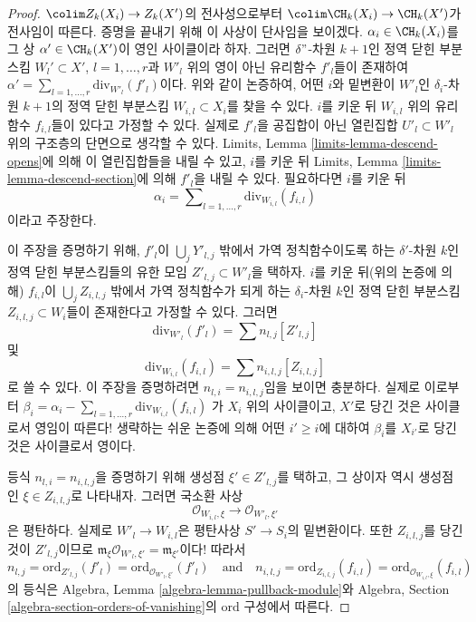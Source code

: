 \begin{proof}
\medskip\noindent
$\colim Z_k(X_i) \to Z_k(X')$의 전사성으로부터
$\colim \CH_k(X_i) \to \CH_k(X')$가 전사임이 따른다.
증명을 끝내기 위해 이 사상이 단사임을 보이겠다.
$\alpha_i \in \CH_k(X_i)$를 그 상
$\alpha' \in \CH_k(X')$이 영인 사이클이라 하자. 그러면
$\delta"$-차원 $k + 1$인 정역 닫힌 부분스킴
$W_l' \subset X'$, $l = 1, \ldots, r$과 $W'_l$ 위의 영이 아닌
유리함수 $f'_l$들이 존재하여
$\alpha' = \sum_{l = 1, \ldots, r} \text{div}_{W'_l}(f'_l)$이다.
위와 같이 논증하여, 어떤 $i$와 밑변환이 $W'_l$인
$\delta_i$-차원 $k + 1$의 정역 닫힌 부분스킴
$W_{i, l} \subset X_i$를 찾을 수 있다. $i$를 키운 뒤
$W_{i, l}$ 위의 유리함수 $f_{i, l}$들이 있다고 가정할 수 있다.
실제로 $f'_l$을 공집합이 아닌 열린집합
$U'_l \subset W'_l$ 위의 구조층의 단면으로 생각할 수 있다.
Limits, Lemma \ref{limits-lemma-descend-opens}에 의해 이 열린집합들을
내릴 수 있고, $i$를 키운 뒤 Limits, Lemma
\ref{limits-lemma-descend-section}에 의해 $f'_l$을 내릴 수 있다.
필요하다면 $i$를 키운 뒤
$$
\alpha_i = \sum\nolimits_{l = 1, \ldots, r} \text{div}_{W_{i, l}}(f_{i, l})
$$
이라고 주장한다.

\medskip\noindent
이 주장을 증명하기 위해, $f'_l$이
$\bigcup_j Y'_{l, j}$ 밖에서 가역 정칙함수이도록 하는
$\delta'$-차원 $k$인 정역 닫힌 부분스킴들의 유한 모임
$Z'_{l, j} \subset W'_l$을 택하자. $i$를 키운 뒤(위의 논증에 의해)
$f_{i, l}$이 $\bigcup_j Z_{i, l, j}$ 밖에서 가역 정칙함수가 되게
하는 $\delta_i$-차원 $k$인 정역 닫힌 부분스킴
$Z_{i, l, j} \subset W_i$들이 존재한다고 가정할 수 있다. 그러면
$$
\text{div}_{W'_l}(f'_l) = \sum n_{l, j} [Z'_{l, j}]
$$
및
$$
\text{div}_{W_{i, l}}(f_{i, l}) = \sum n_{i, l, j} [Z_{i, l, j}]
$$
로 쓸 수 있다. 이 주장을 증명하려면
$n_{l, i} = n_{i, l, j}$임을 보이면 충분하다. 실제로 이로부터
$\beta_i =
\alpha_i - \sum\nolimits_{l = 1, \ldots, r} \text{div}_{W_{i, l}}(f_{i, l})$
가 $X_i$ 위의 사이클이고, $X'$로 당긴 것은 사이클로서 영임이
따른다! 생략하는 쉬운 논증에 의해 어떤 $i' \geq i$에 대하여
$\beta_i$를 $X_{i'}$로 당긴 것은 사이클로서 영이다.

\medskip\noindent
등식 $n_{l, i} = n_{i, l, j}$을 증명하기 위해 생성점
$\xi' \in Z'_{l, j}$를 택하고, 그 상이자 역시 생성점인
$\xi \in Z_{i, l, j}$로 나타내자. 그러면 국소환 사상
$$
\mathcal{O}_{W_{i, l}, \xi}
\longrightarrow
\mathcal{O}_{W'_l, \xi'}
$$
은 평탄하다. 실제로 $W'_l \to W_{i, l}$은 평탄사상
$S' \to S_i$의 밑변환이다. 또한 $Z_{i, l, j}$를 당긴 것이
$Z'_{l, j}$이므로
$\mathfrak m_\xi \mathcal{O}_{W'_l, \xi'} = \mathfrak m_{\xi'}$이다!
따라서
$$
n_{l, j} = \text{ord}_{Z'_{l, j}}(f'_l) =
\text{ord}_{\mathcal{O}_{W'_l, \xi'}}(f'_l)
\quad\text{and}\quad
n_{i, l, j} = \text{ord}_{Z_{i, l, j}}(f_{i, l}) =
\text{ord}_{\mathcal{O}_{W_{i, l}, \xi}}(f_{i, l})
$$
의 등식은 Algebra, Lemma \ref{algebra-lemma-pullback-module}와
Algebra, Section \ref{algebra-section-orders-of-vanishing}의
$\text{ord}$ 구성에서 따른다.
\end{proof}












